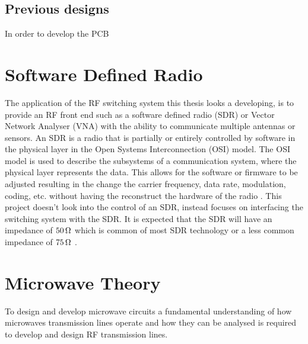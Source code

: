 \documentclass[12pt,openany,a4paper]{book}
\newcommand{\ohm}	{\ensuremath{\rm\,\Omega}}
\begin{document}
\subsection{Previous designs}
In order to develop the PCB 




\section{Software Defined Radio}
The application of the RF switching system this thesis looks a developing, is to provide an RF front end such as a software defined radio (SDR) or Vector Network Analyser (VNA) with the ability to communicate multiple antennas or sensors. An SDR is a radio that is partially or entirely controlled by software in the physical layer in the Open Systems Interconnection (OSI) model. The OSI model is used to describe the subsystems of a communication system, where the physical layer represents the data. This allows for the software or firmware to be adjusted resulting in the change the carrier frequency, data rate, modulation, coding, etc. without having the reconstruct the hardware of the radio \cite{ref6}. This project doesn't look into the control of an SDR, instead focuses on interfacing the switching system with the SDR. It is expected that the SDR will have an impedance of $50\ohm$ which is common of most SDR technology or a less common impedance of $75\ohm$ \cite{ref7}.


\section{Microwave Theory}
To design and develop microwave circuits a fundamental understanding of how microwaves transmission lines operate and how they can be analysed is required to develop and design RF transmission lines.
\end{document}
